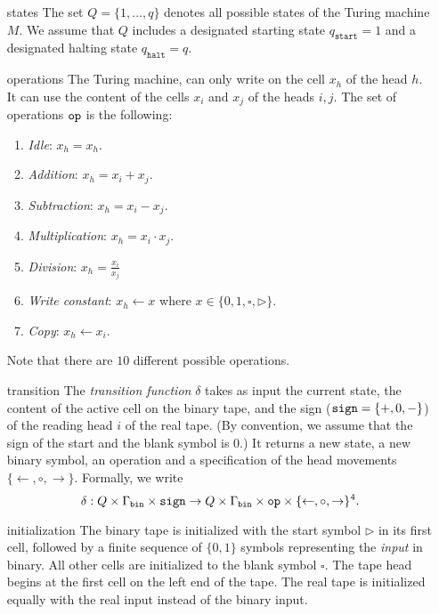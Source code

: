 \documentclass{article}
\begin{document}
\begin{definition}
\begin{itemize}[leftmargin=2cm]
     \item[states]
    The set $Q = \{1,\ldots,q\}$ denotes all possible states of the Turing machine $M$. 
    We assume that $Q$ includes a designated starting state $q_{\texttt{start}} = 1$ and a designated halting state $q_{\texttt{halt}} = q$.
    \item[operations] The Turing machine, can only write on the cell $x_h$ of the head $h$.
    It can use the content of the cells $x_i$ and $x_j$ of the heads $i,j$.
    The set of operations $\texttt{op}$ is the following:
    \begin{enumerate}
        \item \textit{Idle}: $x_h = x_h$.
        \item \textit{Addition}: $x_h = x_i + x_j$.
        \item \textit{Subtraction}: $x_h = x_i - x_j$.
        \item \textit{Multiplication}: $x_h = x_i \cdot x_j$.
        \item \textit{Division}: $x_h = \frac{x_i}{x_j}$ 
        \item \textit{Write constant}: $x_h \leftarrow x$ where $x \in \{0,1,\square, \rhd\}$.
        \item \textit{Copy}: $x_h \leftarrow x_i$. 
    \end{enumerate}
    Note that there are $10$ different possible operations.
    \item[transition] 
    The \textit{transition function} $\delta$ takes as input the current state, the content 
    of the active cell on the binary tape, and the sign
    ($\texttt{sign} = \{+,0,-\}$) of the reading head $i$ of the real tape.
    (By convention, we assume that the sign of the start and the blank symbol is $0$.)
    It returns a new state, a new binary symbol, an operation and a specification of the head movements $\{\leftarrow, \circ, \rightarrow\}$.
    Formally, we write \[\delta : Q \times \Gamma_\texttt{bin} \times \texttt{sign} \rightarrow Q \times \Gamma_\texttt{bin} \times \texttt{op} \times \{\leftarrow, \circ, \rightarrow\}^4.\]
     \item[initialization] 
    The binary tape is initialized with the start symbol $\rhd$ in its first cell, followed by a finite sequence of $\{0,1\}$ symbols representing the \textit{input} in binary. 
    All other cells are initialized to the blank symbol $\square$. 
    The tape head begins at the first cell on the left end of the tape. 
    The real tape is initialized equally with the real input instead of the binary input.

\end{itemize}
\end{definition}
\end{document}
